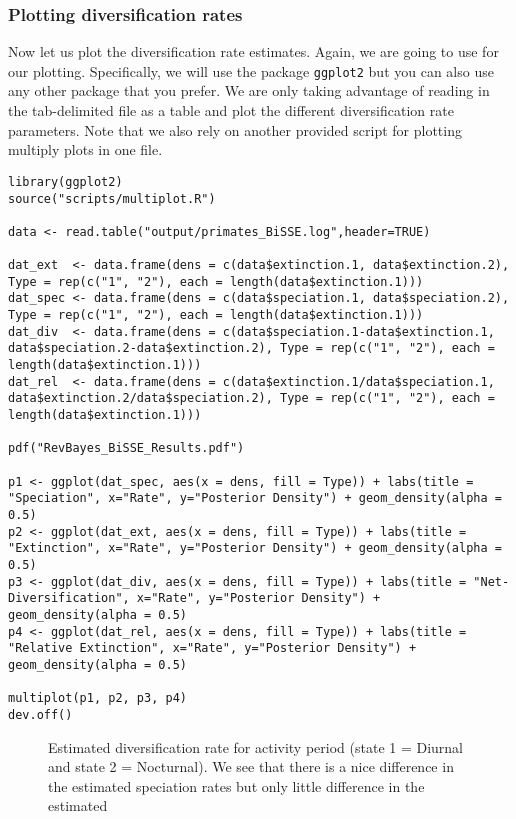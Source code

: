 \subsubsection{Plotting diversification rates}
Now let us plot the diversification rate estimates.
Again, we are going to use \R for our plotting.
Specifically, we will use the package \texttt{ggplot2} but you can also use any other package that you prefer.
We are only taking advantage of reading in the tab-delimited file as a table and plot the different diversification rate parameters.
Note that we also rely on another provided \R script for plotting multiply plots in one file.
{\tt \begin{snugshade*}
\begin{lstlisting}
library(ggplot2)
source("scripts/multiplot.R")

data <- read.table("output/primates_BiSSE.log",header=TRUE)

dat_ext  <- data.frame(dens = c(data$extinction.1, data$extinction.2), Type = rep(c("1", "2"), each = length(data$extinction.1)))
dat_spec <- data.frame(dens = c(data$speciation.1, data$speciation.2), Type = rep(c("1", "2"), each = length(data$extinction.1)))
dat_div  <- data.frame(dens = c(data$speciation.1-data$extinction.1, data$speciation.2-data$extinction.2), Type = rep(c("1", "2"), each = length(data$extinction.1)))
dat_rel  <- data.frame(dens = c(data$extinction.1/data$speciation.1, data$extinction.2/data$speciation.2), Type = rep(c("1", "2"), each = length(data$extinction.1)))

pdf("RevBayes_BiSSE_Results.pdf")

p1 <- ggplot(dat_spec, aes(x = dens, fill = Type)) + labs(title = "Speciation", x="Rate", y="Posterior Density") + geom_density(alpha = 0.5)
p2 <- ggplot(dat_ext, aes(x = dens, fill = Type)) + labs(title = "Extinction", x="Rate", y="Posterior Density") + geom_density(alpha = 0.5)
p3 <- ggplot(dat_div, aes(x = dens, fill = Type)) + labs(title = "Net-Diversification", x="Rate", y="Posterior Density") + geom_density(alpha = 0.5)
p4 <- ggplot(dat_rel, aes(x = dens, fill = Type)) + labs(title = "Relative Extinction", x="Rate", y="Posterior Density") + geom_density(alpha = 0.5)

multiplot(p1, p2, p3, p4)
dev.off()
\end{lstlisting}
\end{snugshade*}}
\begin{figure}[h!]
\centering
{}
\caption{\small Estimated diversification rate for activity period (state 1 = Diurnal and state 2 = Nocturnal). We see that there is a nice difference in the estimated speciation rates but only little difference in the estimated}
\label{fig:anc_states_BiSSE}
\end{figure}


